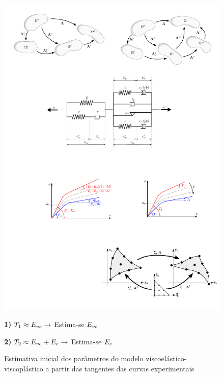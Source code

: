 \documentclass[Tese.tex]{subfiles}
\begin{document}
{\begin{figure}[!htb]
	\centering
	\caption{Estimativa inicial dos parâmetros do modelo viscoelástico-viscoplástico a partir das tangentes das curvas experimentais}
	
	\label{fig:calibration0}
	\begin{multicols}{2}
		
		\raggedleft
		\includegraphics[scale=0.95]{Figuras/PTFE/calibration0.pdf} 
		
		\columnbreak
		
		\footnotesize
		\raggedright
		
		\textbf{1)} $T_1 \approx E_{ve} \rightarrow $ Estima-se $E_{ve}$ 
		
		\vspace{0.35cm}
		
		\textbf{2)} $T_2 \approx E_{ve} + E_e \rightarrow $ Estima-se $E_e$ 
		

\end{multicols}
\end{figure}}
\end{document}
